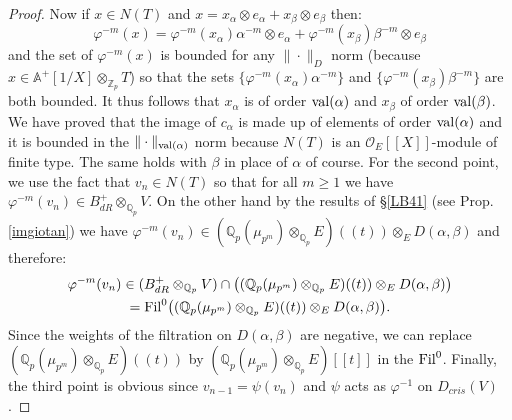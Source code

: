 \documentclass[11pt]{amsart}
\def\Z{{\mathbb Z}_p}
\def\Q{{\mathbb Q}_p}
\def\O{{\mathcal O}_E}
\def\aplus{\mathbb{A}^+}
\begin{document}
\begin{proof}
Now if $x \in N(T)$ and  
$x=x_{\alpha} \otimes e_{\alpha} + x_{\beta} 
\otimes e_{\beta}$ then: 
$$\varphi^{-m}(x) = \varphi^{-m}(x_{\alpha}) 
\alpha^{-m} \otimes e_{\alpha} + \varphi^{-m} (x_{\beta}) \beta^{-m}  
\otimes e_{\beta}$$ 
and the set of $\varphi^{-m}(x)$ is bounded for any 
$\|\cdot\|_D$ norm  
(because $x \in \aplus[1/X] \otimes_{\Z} T$) 
so that the sets $\{\varphi^{-m}(x_{\alpha}) 
\alpha^{-m}\}$ and $\{\varphi^{-m}(x_{\beta}) \beta^{-m}\}$ are both 
bounded. It thus follows that $x_\alpha$ is of order ${\rm 
val}(\alpha)$ and $x_\beta$ of order ${\rm val}(\beta)$. We have  
proved that the image of $c_{\alpha}$ is made up of elements of  
order ${\rm val}(\alpha)$ and it is 
bounded in the $\|\cdot\|_{{\rm val}(\alpha)}$ norm because $N(T)$ is 
an $\O[[X]]$-module of finite type. The same holds with $\beta$ in 
place of $\alpha$ of course. For the second point, we use the fact  
that $v_n \in N(T)$ so that for all $m \geq 1$ 
we have $\varphi^{-m}(v_n) \in B_{dR}^+ \otimes_{\Q} 
V$. On the other hand by the results of \S\ref{LB41}  
(see Prop.\ref{imgiotan}) we have  
$\varphi^{-m}(v_n) \in (\Q(\mu_{p^m})\otimes_{\Q}E)((t)) 
\otimes_ED(\alpha,\beta)$ and therefore: \begin{multline*}  
\varphi^{-m}(v_n) \in  
(B_{dR}^+ \otimes_{\Q} 
V) \cap \big((\Q(\mu_{p^m})\otimes_{\Q}E)((t))  
\otimes_ED(\alpha,\beta)\big) 
\\ = {\rm Fil}^0 
\big((\Q(\mu_{p^m})\otimes_{\Q}E)((t)) 
\otimes_ED(\alpha,\beta)\big).  
\end{multline*}
Since the weights of the filtration on $D(\alpha,\beta)$ are negative, we can replace $(\Q(\mu_{p^m})\otimes_{\Q}E)((t))$ by $(\Q(\mu_{p^m})\otimes_{\Q}E)[[t]]$ in the ${\rm Fil}^0$. Finally, the third point is obvious since $v_{n-1}=\psi(v_n)$  
and $\psi$ acts as $\varphi^{-1}$ on $D_{cris}(V)$. 
\end{proof} 
 
\end{document}
